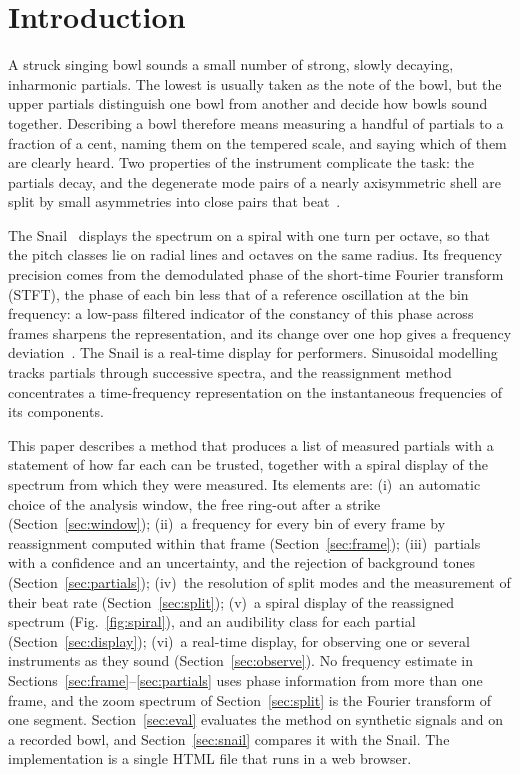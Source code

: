 \documentclass[10pt,a4paper,twocolumn]{article}
\begin{document}
\section{Introduction}

A struck singing bowl sounds a small number of strong, slowly decaying, inharmonic partials. The lowest is usually taken as the note of the bowl, but the upper partials distinguish one bowl from another and decide how bowls sound together. Describing a bowl therefore means measuring a handful of partials to a fraction of a cent, naming them on the tempered scale, and saying which of them are clearly heard. Two properties of the instrument complicate the task: the partials decay, and the degenerate mode pairs of a nearly axisymmetric shell are split by small asymmetries into close pairs that beat~\cite{FletcherRossing,Inacio,Terwagne}.

The Snail~\cite{HelieSnail,HelieTimbre} displays the spectrum on a spiral with one turn per octave, so that the pitch classes lie on radial lines and octaves on the same radius. Its frequency precision comes from the demodulated phase of the short-time Fourier transform (STFT), the phase of each bin less that of a reference oscillation at the bin frequency: a low-pass filtered indicator of the constancy of this phase across frames sharpens the representation, and its change over one hop gives a frequency deviation~\cite{HelieTimbre,HeliePatent}. The Snail is a real-time display for performers. Sinusoidal modelling~\cite{McAulay,PARSHL,SMS} tracks partials through successive spectra, and the reassignment method~\cite{Kodera76,Kodera78,AugerFlandrin} concentrates a time-frequency representation on the instantaneous frequencies of its components.

This paper describes a method that produces a list of measured partials with a statement of how far each can be trusted, together with a spiral display of the spectrum from which they were measured. Its elements are:
(i)~an automatic choice of the analysis window, the free ring-out after a strike (Section~\ref{sec:window});
(ii)~a frequency for every bin of every frame by reassignment computed within that frame (Section~\ref{sec:frame});
(iii)~partials with a confidence and an uncertainty, and the rejection of background tones (Section~\ref{sec:partials});
(iv)~the resolution of split modes and the measurement of their beat rate (Section~\ref{sec:split});
(v)~a spiral display of the reassigned spectrum (Fig.~\ref{fig:spiral}), and an audibility class for each partial (Section~\ref{sec:display});
(vi)~a real-time display, for observing one or several instruments as they sound (Section~\ref{sec:observe}).
No frequency estimate in Sections~\ref{sec:frame}--\ref{sec:partials} uses phase information from more than one frame, and the zoom spectrum of Section~\ref{sec:split} is the Fourier transform of one segment. Section~\ref{sec:eval} evaluates the method on synthetic signals and on a recorded bowl, and Section~\ref{sec:snail} compares it with the Snail. The implementation is a single HTML file that runs in a web browser.
\end{document}

